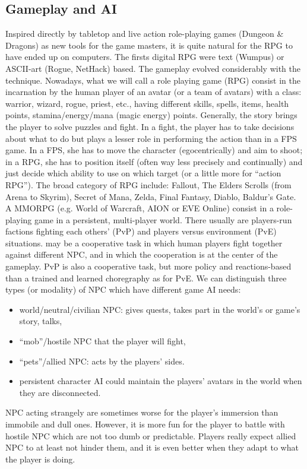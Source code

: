 \subsection{Gameplay and AI}
Inspired directly by tabletop and live action role-playing games (Dungeon \& Dragons) as new tools for the game masters, it is quite natural for the RPG to have ended up on computers. The firsts digital RPG were text (Wumpus) or ASCII-art (Rogue, NetHack) based. The gameplay evolved considerably with the technique. Nowadays, what we will call a role playing game (RPG) consist in the incarnation by the human player of an avatar (or a team of avatars) with a class: warrior, wizard, rogue, priest, etc., having different skills, spells, items, health points, stamina/energy/mana (magic energy) points. Generally, the story brings the player to solve puzzles and fight. In a fight, the player has to take decisions about what to do but plays a lesser role in performing the action than in a FPS game. In a FPS, she has to move the character (egocentrically) and aim to shoot; in a RPG, she has to position itself (often way less precisely and continually) and just decide which ability to use on which target (or a little more for ``action RPG''). The broad category of RPG include: Fallout, The Elders Scrolls (from Arena to Skyrim), Secret of Mana, Zelda, Final Fantasy, Diablo, Baldur's Gate. A MMORPG (e.g. World of Warcraft, AION or EVE Online) consist in a role-playing game in a persistent, multi-player world. There usually are players-run factions fighting each others’ (PvP) and players versus environment (PvE) situations.  may be a cooperative task in which human players fight together against different NPC, and in which the cooperation is at the center of the gameplay. PvP is also a cooperative task, but more policy and reactions-based than a trained and learned choregraphy as for PvE. We can distinguish three types (or modality) of NPC which have different game AI needs:
\begin{itemize}
    \item world/neutral/civilian NPC: gives quests, takes part in the world's or game's story, talks,
    \item ``mob''/hostile NPC that the player will fight, 
    \item ``pets''/allied NPC: acts by the players' sides.
    \item persistent character AI could maintain the players' avatars in the world when they are disconnected.
\end{itemize}
NPC acting strangely are sometimes worse for the player's immersion than immobile and dull ones. However, it is more fun for the player to battle with hostile NPC which are not too dumb or predictable. Players really expect allied NPC to at least not hinder them, and it is even better when they adapt to what the player is doing. %

